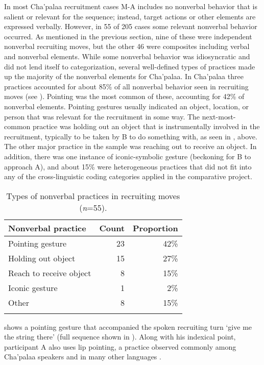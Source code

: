 \documentclass[output=paper]{langsci/langscibook}
\begin{document}
In most Cha'palaa recruitment cases M-A includes no nonverbal behavior that is salient or relevant for the sequence; instead, target actions or other elements are expressed verbally. However, in 55 of 205 cases some relevant nonverbal behavior occurred. As mentioned in the previous section, nine of these were independent nonverbal recruiting moves, but the other 46 were composites including verbal and nonverbal elements. While some nonverbal behavior was idiosyncratic and did not lend itself to categorization, several well-defined types of practices made up the majority of the nonverbal elements for Cha'palaa. In Cha'palaa three practices accounted for about 85\% of all nonverbal behavior seen in recruiting moves (see ). Pointing was the most common of these, accounting for 42\% of nonverbal elements. Pointing gestures usually indicated an object, location, or person that was relevant for the recruitment in some way. The next-most-common practice was holding out an object that is instrumentally involved in the recruitment, typically to be taken by B to do something with, as seen in , above. The other major practice in the sample was reaching out to receive an object. In addition, there was one instance of iconic-symbolic gesture (beckoning for B to approach A), and about 15\% were heterogeneous practices that did not fit into any of the cross-linguistic coding categories applied in the comparative project.

\begin{table}
\begin{tabularx}{0.66\textwidth}{Xrr}
\lsptoprule
Nonverbal practice & Count & Proportion \\
\midrule
Pointing gesture & 23 & 42\%\\
Holding out object & 15 & 27\%\\
Reach to receive object & 8 & 15\%\\
Iconic gesture & 1 & 2\%\\
Other & 8 & 15\%\\
\lspbottomrule
\end{tabularx}
\caption{Types of nonverbal practices in recruiting moves (\textit{n}=55).}
\label{tab:floyd:2}
\end{table}

 shows a pointing gesture that accompanied the spoken recruiting turn ‘give me the string there’ (full sequence shown in ). Along with his indexical point, participant A also uses lip pointing, a practice observed commonly among Cha'palaa speakers \citep{dingemanse_conversation_2014} and in many other languages \citep{Sherzer1973,Enfield2001}.
\end{document}
